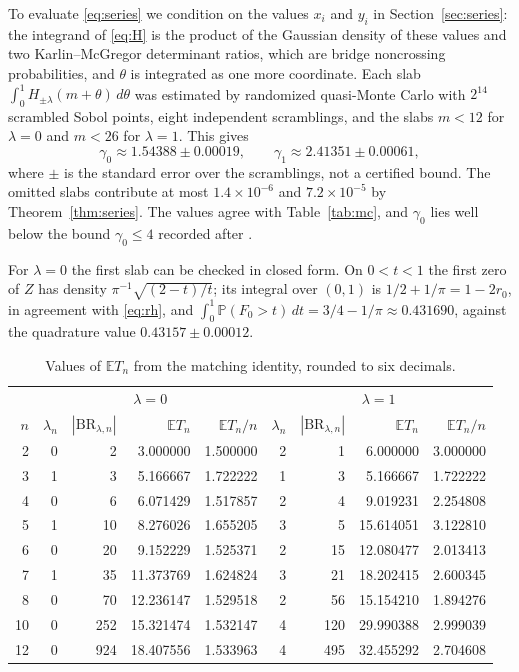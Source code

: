 \documentclass[11pt]{amsart}
\theoremstyle{remark}
\numberwithin{equation}{section}
\newcommand{\PP}{\mathbb{P}}
\newcommand{\EE}{\mathbb{E}}
\newcommand{\BR}{\mathrm{BR}}
\begin{document}
To evaluate \eqref{eq:series} we condition on the values $x_i$ and $y_i$ in Section~\ref{sec:series}: the integrand of \eqref{eq:H} is the product of the Gaussian density of these values and two Karlin--McGregor determinant ratios, which are bridge noncrossing probabilities, and $\theta$ is integrated as one more coordinate. Each slab $\int_0^1H_{\pm\lambda}(m+\theta)\,d\theta$ was estimated by randomized quasi-Monte Carlo with $2^{14}$ scrambled Sobol points, eight independent scramblings, and the slabs $m<12$ for $\lambda=0$ and $m<26$ for $\lambda=1$. This gives
\[
\gamma_0\approx1.54388\pm0.00019,\qquad\gamma_1\approx2.41351\pm0.00061,
\]
where $\pm$ is the standard error over the scramblings, not a certified bound. The omitted slabs contribute at most $1.4\times10^{-6}$ and $7.2\times10^{-5}$ by Theorem~\ref{thm:series}. The values agree with Table~\ref{tab:mc}, and $\gamma_0$ lies well below the bound $\gamma_0\le4$ recorded after \cite[Proposition~2.4]{PT}.

For $\lambda=0$ the first slab can be checked in closed form. On $0<t<1$ the first zero of $Z$ has density $\pi^{-1}\sqrt{(2-t)/t}$; its integral over $(0,1)$ is $1/2+1/\pi=1-2r_0$, in agreement with \eqref{eq:rh}, and $\int_0^1\PP(F_0>t)\,dt=3/4-1/\pi\approx0.431690$, against the quadrature value $0.43157\pm0.00012$.

\begin{table}[tbp]
\centering
\begin{tabular}{rrrrrrrrr}
\toprule
& \multicolumn{4}{c}{$\lambda=0$} & \multicolumn{4}{c}{$\lambda=1$}\\
\cmidrule(lr){2-5}\cmidrule(lr){6-9}
$n$ & $\lambda_n$ & $|\BR_{\lambda,n}|$ & $\EE T_n$ & $\EE T_n/n$ & $\lambda_n$ & $|\BR_{\lambda,n}|$ & $\EE T_n$ & $\EE T_n/n$\\
\midrule
2 & 0 & 2 & 3.000000 & 1.500000 & 2 & 1 & 6.000000 & 3.000000\\
3 & 1 & 3 & 5.166667 & 1.722222 & 1 & 3 & 5.166667 & 1.722222\\
4 & 0 & 6 & 6.071429 & 1.517857 & 2 & 4 & 9.019231 & 2.254808\\
5 & 1 & 10 & 8.276026 & 1.655205 & 3 & 5 & 15.614051 & 3.122810\\
6 & 0 & 20 & 9.152229 & 1.525371 & 2 & 15 & 12.080477 & 2.013413\\
7 & 1 & 35 & 11.373769 & 1.624824 & 3 & 21 & 18.202415 & 2.600345\\
8 & 0 & 70 & 12.236147 & 1.529518 & 2 & 56 & 15.154210 & 1.894276\\
10 & 0 & 252 & 15.321474 & 1.532147 & 4 & 120 & 29.990388 & 2.999039\\
12 & 0 & 924 & 18.407556 & 1.533963 & 4 & 495 & 32.455292 & 2.704608\\
\bottomrule
\end{tabular}
\caption{Values of $\EE T_n$ from the matching identity, rounded to six decimals.}\label{tab:exact}
\end{table}
\end{document}
